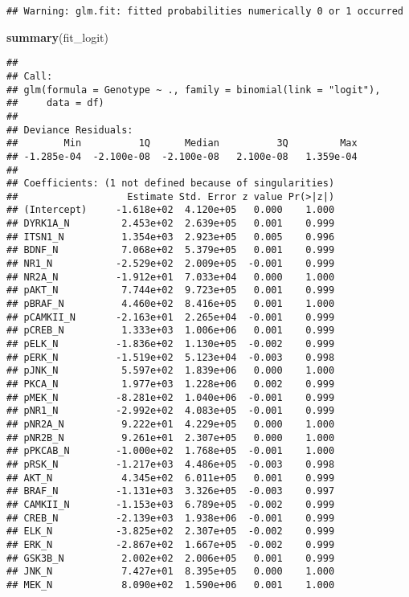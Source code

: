 \documentclass[]{article}
\newenvironment{Shaded}{\begin{snugshade}}{\end{snugshade}}
\newcommand{\KeywordTok}[1]{\textcolor[rgb]{0.13,0.29,0.53}{\textbf{#1}}}
\newcommand{\NormalTok}[1]{#1}
\begin{document}
\begin{verbatim}
## Warning: glm.fit: fitted probabilities numerically 0 or 1 occurred
\end{verbatim}

\begin{Shaded}
\begin{Highlighting}[]
\KeywordTok{summary}\NormalTok{(fit_logit)}
\end{Highlighting}
\end{Shaded}

\begin{verbatim}
## 
## Call:
## glm(formula = Genotype ~ ., family = binomial(link = "logit"), 
##     data = df)
## 
## Deviance Residuals: 
##        Min          1Q      Median          3Q         Max  
## -1.285e-04  -2.100e-08  -2.100e-08   2.100e-08   1.359e-04  
## 
## Coefficients: (1 not defined because of singularities)
##                   Estimate Std. Error z value Pr(>|z|)
## (Intercept)     -1.618e+02  4.120e+05   0.000    1.000
## DYRK1A_N         2.453e+02  2.639e+05   0.001    0.999
## ITSN1_N          1.354e+03  2.923e+05   0.005    0.996
## BDNF_N           7.068e+02  5.379e+05   0.001    0.999
## NR1_N           -2.529e+02  2.009e+05  -0.001    0.999
## NR2A_N          -1.912e+01  7.033e+04   0.000    1.000
## pAKT_N           7.744e+02  9.723e+05   0.001    0.999
## pBRAF_N          4.460e+02  8.416e+05   0.001    1.000
## pCAMKII_N       -2.163e+01  2.265e+04  -0.001    0.999
## pCREB_N          1.333e+03  1.006e+06   0.001    0.999
## pELK_N          -1.836e+02  1.130e+05  -0.002    0.999
## pERK_N          -1.519e+02  5.123e+04  -0.003    0.998
## pJNK_N           5.597e+02  1.839e+06   0.000    1.000
## PKCA_N           1.977e+03  1.228e+06   0.002    0.999
## pMEK_N          -8.281e+02  1.040e+06  -0.001    0.999
## pNR1_N          -2.992e+02  4.083e+05  -0.001    0.999
## pNR2A_N          9.222e+01  4.229e+05   0.000    1.000
## pNR2B_N          9.261e+01  2.307e+05   0.000    1.000
## pPKCAB_N        -1.000e+02  1.768e+05  -0.001    1.000
## pRSK_N          -1.217e+03  4.486e+05  -0.003    0.998
## AKT_N            4.345e+02  6.011e+05   0.001    0.999
## BRAF_N          -1.131e+03  3.326e+05  -0.003    0.997
## CAMKII_N        -1.153e+03  6.789e+05  -0.002    0.999
## CREB_N          -2.139e+03  1.938e+06  -0.001    0.999
## ELK_N           -3.825e+02  2.307e+05  -0.002    0.999
## ERK_N           -2.867e+02  1.667e+05  -0.002    0.999
## GSK3B_N          2.002e+02  2.006e+05   0.001    0.999
## JNK_N            7.427e+01  8.395e+05   0.000    1.000
## MEK_N            8.090e+02  1.590e+06   0.001    1.000

\end{verbatim}
\end{document}
